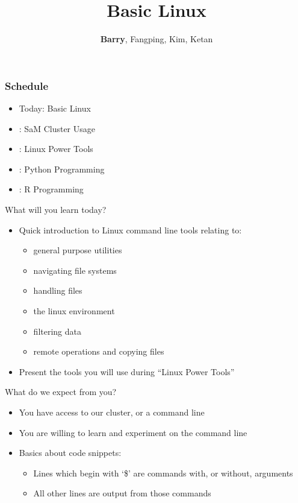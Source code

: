 \documentclass[hyperref={pdfpagelabels=false},12pt]{beamer}
\title[Basic Unix/Linux]{{Basic Linux}}
\author[Basic Unix/Linux]{{\textbf{Barry}, Fangping, Kim, Ketan}}
\date{}
\begin{document}
\begin{frame}[plain]
\titlepage
\end{frame}

\begin{frame}
\frametitle{Schedule}
\centering
\begin{itemize}
    \item Today: Basic Linux
    \item : SaM Cluster Usage
    \item : Linux Power Tools
    \item : Python Programming
    \item : R Programming
\end{itemize}
\end{frame}

\begin{frame}{What will you learn today?}
    \begin{itemize}
        \item Quick introduction to Linux command line tools relating to:
        \begin{itemize}
            \item general purpose utilities
            \item navigating file systems
            \item handling files
            \item the linux environment
            \item filtering data
            \item remote operations and copying files
        \end{itemize}
        \item Present the tools you will use during ``Linux Power Tools''
    \end{itemize}
\end{frame}

\begin{frame}{What do we expect from you?}
    \begin{itemize}
        \item You have access to our cluster, or a command line
        \item You are willing to learn and experiment on the command line
        \item Basics about code snippets:
        \begin{itemize}
            \item Lines which begin with `\$' are commands with, or without, arguments
            \item All other lines are output from those commands
        \end{itemize}
    \end{itemize}
\end{frame}
\end{document}
